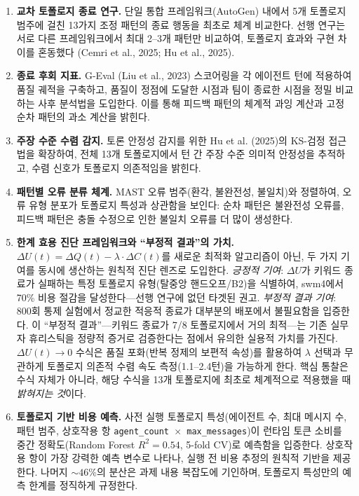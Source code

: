 \documentclass[a4paper,11pt]{article}
\begin{document}
\begin{enumerate}
    \item \textbf{교차 토폴로지 종료 연구.} 단일 통합 프레임워크(AutoGen) 내에서 5개 토폴로지 범주에 걸친 13가지 조정 패턴의 종료 행동을 최초로 체계 비교한다. 선행 연구는 서로 다른 프레임워크에서 최대 2--3개 패턴만 비교하여, 토폴로지 효과와 구현 차이를 혼동했다 (Cemri et al., 2025; Hu et al., 2025).

    \item \textbf{종료 후회 지표.} G-Eval (Liu et al., 2023) 스코어링을 각 에이전트 턴에 적용하여 품질 궤적을 구축하고, 품질이 정점에 도달한 시점과 팀이 종료한 시점을 정밀 비교하는 사후 분석법을 도입한다. 이를 통해 피드백 패턴의 체계적 과잉 계산과 고정 순차 패턴의 과소 계산을 밝힌다.

    \item \textbf{주장 수준 수렴 감지.} 토론 안정성 감지를 위한 Hu et al. (2025)의 KS-검정 접근법을 확장하여, 전체 13개 토폴로지에서 턴 간 주장 수준 의미적 안정성을 추적하고, 수렴 신호가 토폴로지 의존적임을 밝힌다.

    \item \textbf{패턴별 오류 분류 체계.} MAST 오류 범주(환각, 불완전성, 불일치)와 정렬하여, 오류 유형 분포가 토폴로지 특성과 상관함을 보인다: 순차 패턴은 불완전성 오류를, 피드백 패턴은 충돌 수정으로 인한 불일치 오류를 더 많이 생성한다.

    \item \textbf{한계 효용 진단 프레임워크와 ``부정적 결과''의 가치.} $\Delta U(t) = \Delta Q(t) - \lambda \cdot \Delta C(t)$를 새로운 최적화 알고리즘이 아닌, 두 가지 기여를 동시에 생산하는 원칙적 진단 렌즈로 도입한다. \emph{긍정적 기여}: $\Delta U$가 키워드 종료가 실패하는 특정 토폴로지 유형(탈중앙 핸드오프/B2)을 식별하여, swm4에서 70\% 비용 절감을 달성한다---선행 연구에 없던 타겟된 권고. \emph{부정적 결과 기여}: 800회 통제 실험에서 정교한 적응적 종료가 대부분의 배포에서 불필요함을 입증한다. 이 ``부정적 결과''---키워드 종료가 7/8 토폴로지에서 거의 최적---는 기존 실무자 휴리스틱을 정량적 증거로 검증한다는 점에서 유의한 실용적 가치를 가진다. $\Delta U(t) \to 0$ 수식은 품질 포화(반복 정제의 보편적 속성)를 활용하여 $\lambda$ 선택과 무관하게 토폴로지 의존적 수렴 속도 측정(1.1--2.4턴)을 가능하게 한다. 핵심 통찰은 수식 자체가 아니라, 해당 수식을 13개 토폴로지에 최초로 체계적으로 적용했을 때 \emph{밝혀지는 것}이다.

    \item \textbf{토폴로지 기반 비용 예측.} 사전 실행 토폴로지 특성(에이전트 수, 최대 메시지 수, 패턴 범주, 상호작용 항 \texttt{agent\_count $\times$ max\_messages})이 런타임 토큰 소비를 중간 정확도(Random Forest $R^2=0.54$, 5-fold CV)로 예측함을 입증한다. 상호작용 항이 가장 강력한 예측 변수로 나타나, 실행 전 비용 추정의 원칙적 기반을 제공한다. 나머지 ${\sim}46\%$의 분산은 과제 내용 복잡도에 기인하며, 토폴로지 특성만의 예측 한계를 정직하게 규정한다.


\end{enumerate}
\end{document}
